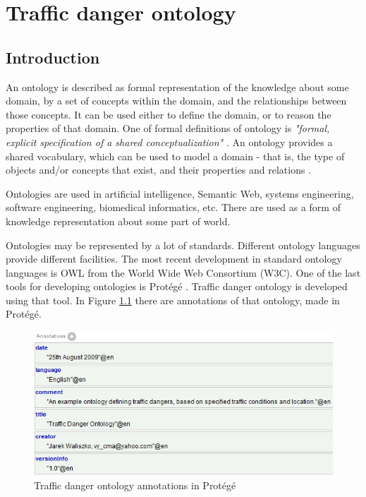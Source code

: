 \chapter{Traffic danger ontology}
\label{cha:trafficDangerOntology}

\section{Introduction}
\label{sec:introductionTochapter3}

An ontology is described as formal representation of the knowledge about some domain, by a set of concepts within the domain, and the relationships between those concepts. It can be used either to define the domain, or to reason the properties of that domain. One of formal definitions of ontology is \textit{"formal, explicit specification of a shared conceptualization"} \cite{Gru93}. An ontology provides a shared vocabulary, which can be used to model a domain - that is, the type of objects and/or concepts that exist, and their properties and relations \cite{Arv08}.

Ontologies are used in artificial intelligence, Semantic Web, systems engineering, software engineering, biomedical informatics, etc. There are used as a form of knowledge representation about some part of world.

Ontologies may be represented by a lot of standards. Different ontology languages provide different facilities. The most recent development in standard ontology languages is OWL from the World Wide Web Consortium (W3C). One of the last tools for developing ontologies is Protégé \cite{OWLGuide}. Traffic danger ontology is developed using that tool. In Figure \ref{fig:annotations} there are annotations of that ontology, made in Protégé.

\medskip

\begin{figure}[htp]
\centering
\includegraphics[scale=0.7]{images/chapter3/Annotations}
\caption{Traffic danger ontology annotations in Protégé}
\label{fig:annotations}
\end{figure}

